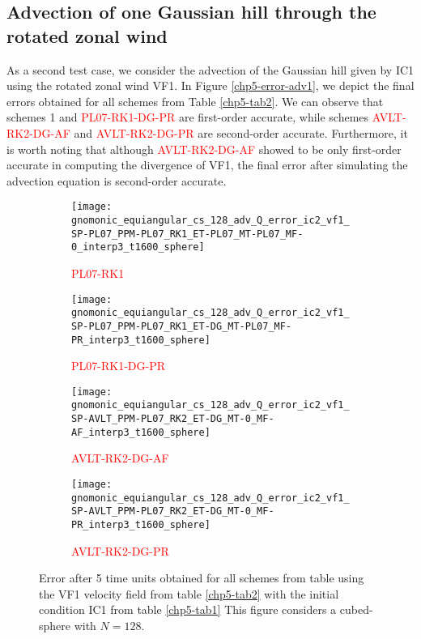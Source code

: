\subsection{Advection of one Gaussian hill through the rotated zonal wind}
As a second test case, we consider the advection of the Gaussian hill given by IC1 using 
the rotated zonal wind VF1.
In Figure \ref{chp5-error-adv1}, we depict the final errors obtained for 
all schemes from Table \ref{chp5-tab2}.
We can observe that schemes 1 and \textcolor{red}{PL07-RK1-DG-PR} are first-order accurate, while schemes 
\textcolor{red}{AVLT-RK2-DG-AF}  and  \textcolor{red}{AVLT-RK2-DG-PR} are second-order accurate.
Furthermore, it is worth noting that although \textcolor{red}{AVLT-RK2-DG-AF} showed to be only first-order 
accurate in computing the divergence of VF1, the final error after simulating the advection 
equation is second-order accurate.
\begin{figure}[!htb]
	\centering
	\begin{subfigure}{0.4\textwidth}
		\centering
		\texttt{[image: gnomonic\_equiangular\_cs\_128\_adv\_Q\_error\_ic2\_vf1\_SP-PL07\_PPM-PL07\_RK1\_ET-PL07\_MT-PL07\_MF-0\_interp3\_t1600\_sphere]}
		\caption{\textcolor{red}{PL07-RK1} \label{chp5-adv1-s1}}
	\end{subfigure}
	\begin{subfigure}{0.4\textwidth}
		\centering
		\texttt{[image: gnomonic\_equiangular\_cs\_128\_adv\_Q\_error\_ic2\_vf1\_SP-PL07\_PPM-PL07\_RK1\_ET-DG\_MT-PL07\_MF-PR\_interp3\_t1600\_sphere]}
		\caption{\textcolor{red}{PL07-RK1-DG-PR} \label{chp5-adv1-s2}}
	\end{subfigure}
	
	\begin{subfigure}{0.4\textwidth}
		\centering
		\texttt{[image: gnomonic\_equiangular\_cs\_128\_adv\_Q\_error\_ic2\_vf1\_SP-AVLT\_PPM-PL07\_RK2\_ET-DG\_MT-0\_MF-AF\_interp3\_t1600\_sphere]}
		\caption{\textcolor{red}{AVLT-RK2-DG-AF} \label{chp5-adv1-s3}}
	\end{subfigure}
	\begin{subfigure}{0.4\textwidth}
		\centering
		\texttt{[image: gnomonic\_equiangular\_cs\_128\_adv\_Q\_error\_ic2\_vf1\_SP-AVLT\_PPM-PL07\_RK2\_ET-DG\_MT-0\_MF-PR\_interp3\_t1600\_sphere]}
		\caption{\textcolor{red}{AVLT-RK2-DG-PR} \label{chp5-adv1-s4}}
	\end{subfigure}
	\caption{ Error after 5 time units obtained for all schemes from table using the VF1 velocity field from table \ref{chp5-tab2} with the initial condition IC1 from  table \ref{chp5-tab1} 
		This figure considers a cubed-sphere with $N=128$. \label{chp5-adv1}}
\end{figure}

